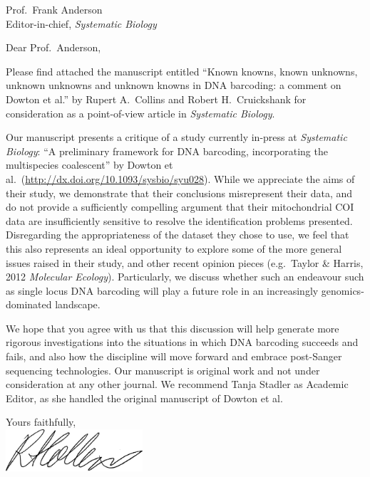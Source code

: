 \documentclass[a4paper,12pt]{letter}
\begin{document}
\begin{letter}{Prof.\ Frank Anderson \\ Editor-in-chief, \emph{Systematic Biology}}

\opening{Dear Prof.\ Anderson,} 

Please find attached the manuscript entitled ``Known knowns, known unknowns, unknown unknowns and unknown knowns in DNA barcoding: a comment on Dowton et al.'' by Rupert A.\ Collins and Robert H.\ Cruickshank for consideration as a point-of-view article in \emph{Systematic Biology}. 

Our manuscript presents a critique of a study currently in-press at \emph{Systematic Biology}: ``A preliminary framework for DNA barcoding, incorporating the multispecies coalescent'' by Dowton et al.\ ({\small \url{http://dx.doi.org/10.1093/sysbio/syu028}}). While we appreciate the aims of their study, we demonstrate that their conclusions misrepresent their data, and do not provide a sufficiently compelling argument that their mitochondrial COI data are insufficiently sensitive to resolve the identification problems presented. Disregarding the appropriateness of the dataset they chose to use, we feel that this also represents an ideal opportunity to explore some of the more general issues raised in their study, and other recent opinion pieces (e.g.\ Taylor \& Harris, 2012 \emph{Molecular Ecology}). Particularly, we discuss whether such an endeavour such as single locus DNA barcoding will play a future role in an increasingly genomics-dominated landscape.

We hope that you agree with us that this discussion will help generate more rigorous investigations into the situations in which DNA barcoding succeeds and fails, and also how the discipline will move forward and embrace post-Sanger sequencing technologies. Our manuscript is original work and not under consideration at any other journal. We recommend Tanja Stadler as Academic Editor, as she handled the original manuscript of Dowton et al.


\closing{Yours faithfully,\\ 
\vspace{10 mm}
\includegraphics[width=2in]{signature.png}}

%

\end{letter}
\end{document}
